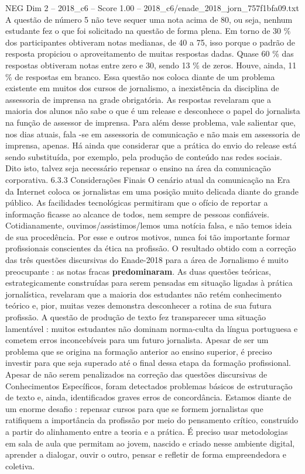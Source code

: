 \begin{textsample}{NEG Dim 2 – 2018\_c6 – Score 1.00 – 2018\_c6/enade\_2018\_jorn\_757f1bfa09.txt}
A questão de número 5 não teve sequer uma nota acima de 80, ou seja, nenhum estudante fez o que foi solicitado na questão de forma plena.
Em torno de 30 \% dos participantes obtiveram notas medianas, de 40 a 75, isso porque o padrão de resposta propiciou o aproveitamento de muitas respostas dadas.
Quase 60 \% das respostas obtiveram notas entre zero e 30, sendo 13 \% de zeros.
Houve, ainda, 11 \% de respostas em branco.
Essa questão nos coloca diante de um problema existente em muitos dos cursos de jornalismo, a inexistência da disciplina de assessoria de imprensa na grade obrigatória.
As respostas revelaram que a maioria dos alunos não sabe o que é um release e desconhece o papel do jornalista na função de assessor de imprensa.
Para além desse problema, vale salientar que, nos dias atuais, fala -se em assessoria de comunicação e não mais em assessoria de imprensa, apenas.
Há ainda que considerar que a prática do envio do release está sendo substituída, por exemplo, pela produção de conteúdo nas redes sociais.
Dito isto, talvez seja necessário repensar o ensino na área da comunicação corporativa. 6.3.3 Considerações Finais O cenário atual da comunicação na Era da Internet coloca os jornalistas em uma posição muito delicada diante do grande público.
As facilidades tecnológicas permitiram que o ofício de reportar a informação ficasse ao alcance de todos, nem sempre de pessoas confiáveis.
Cotidianamente, ouvimos/assistimos/lemos uma notícia falsa, e não temos ideia de sua procedência.
Por esse e outros motivos, nunca foi tão importante formar profissionais conscientes da ética na profissão.
O resultado obtido com a correção das três questões discursivas do Enade-2018 para a área de Jornalismo é muito preocupante : as notas fracas \textbf{predominaram}.
As duas questões teóricas, estrategicamente construídas para serem pensadas em situação ligadas à prática jornalística, revelaram que a maioria dos estudantes não retém conhecimento teórico e, pior, muitas vezes demonstra desconhecer a rotina de sua futura profissão.
A questão de produção de texto fez transparecer uma situação lamentável : muitos estudantes não dominam norma-culta da língua portuguesa e cometem erros inconcebíveis para um futuro jornalista.
Apesar de ser um problema que se origina na formação anterior ao ensino superior, é preciso investir para que seja superado até o final dessa etapa da formação profissional.
Apesar de não serem penalizados na correção das questões discursivas de Conhecimentos Específicos, foram detectados problemas básicos de estruturação de texto e, ainda, identificados graves erros de concordância.
Estamos diante de um enorme desafio : repensar cursos para que se formem jornalistas que ratifiquem a importância da profissão por meio do pensamento crítico, construído a partir do alinhamento entre a teoria e a prática.
É preciso usar metodologias em sala de aula que permitam ao jovem, nascido e criado nesse ambiente digital, aprender a dialogar, ouvir o outro, pensar e refletir de forma empreendedora e coletiva.

\end{textsample}
